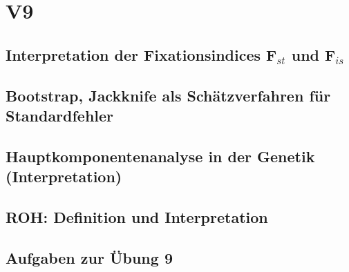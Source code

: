 \section{V9}
\subsection{Interpretation der Fixationsindices F$_{st}$ und F$_{is}$}

\subsection{Bootstrap, Jackknife als Schätzverfahren für Standardfehler}

\subsection{Hauptkomponentenanalyse in der Genetik (Interpretation)}

\subsection{ROH: Definition und Interpretation}

\subsection{Aufgaben zur Übung 9}